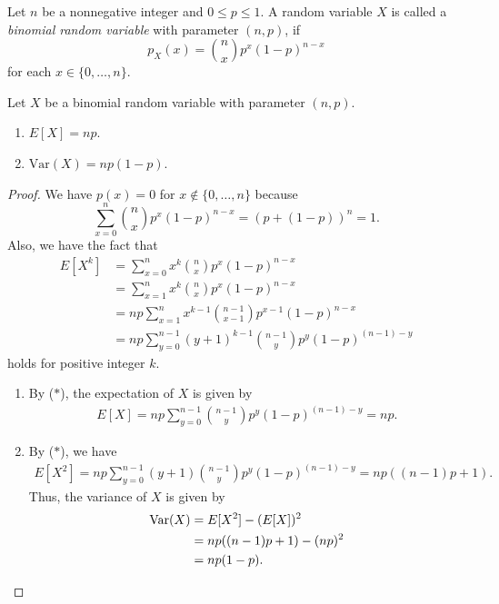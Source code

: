 \begin{definition}
  Let $n$ be a nonnegative integer and $0 \leq p \leq 1$.
  A random variable $X$ is called a \emph{binomial random variable} with
  parameter $(n, p)$, if
  \begin{equation*}
    p_X(x) = \binom{n}{x} p^x (1-p)^{n-x}
  \end{equation*}
  for each $x \in \{0, \dots, n\}$.
\end{definition}

\begin{theorem}
  Let $X$ be a binomial random variable with parameter $(n, p)$.
  \begin{enumerate}
    \item $E[X] = np$.
    \item $\mathrm{Var}(X) = np(1 - p)$.
  \end{enumerate}
\end{theorem}
\begin{proof}
  We have $p(x) = 0$ for $x \notin \{0, \dots, n\}$ because
  \begin{equation*}
    \sum_{x=0}^n \binom{n}{x} p^x (1-p)^{n-x} = (p + (1-p))^n = 1.
  \end{equation*}
  Also, we have the fact that
  \begin{align*}
    E[X^k]
    &= \sum_{x=0}^n x^k \binom{n}{x} p^x (1-p)^{n-x} \\
    &= \sum_{x=1}^n x^k \binom{n}{x} p^x (1-p)^{n-x} \\
    &= np \sum_{x=1}^n x^{k-1} \binom{n-1}{x-1} p^{x-1} (1-p)^{n-x} \\
    &= np \sum_{y=0}^{n-1} (y+1)^{k-1} \binom{n-1}{y} p^y (1-p)^{(n-1)-y}
       \tag{$\ast$}
  \end{align*}
  holds for positive integer $k$.
  \begin{enumerate}
    \item By ($\ast$), the expectation of $X$ is given by
      \begin{align*}
        E[X]
        = np\sum_{y=0}^{n-1} \binom{n-1}{y} p^y (1-p)^{(n-1)-y}
        = np.
      \end{align*}
    \item By ($\ast$), we have
      \begin{align*}
        E[X^2]
        = np\sum_{y=0}^{n-1} (y+1)\binom{n-1}{y} p^y (1-p)^{(n-1)-y}
        = np((n-1)p+1).
      \end{align*}
      Thus, the variance of $X$ is given by
      \begin{align*}
        \mathrm{Var}(X)
        &= E[X^2] - (E[X])^2 \\
        &= np((n-1)p + 1) - (np)^2 \\
        &= np(1 - p). \qedhere
      \end{align*}
  \end{enumerate}
\end{proof}

